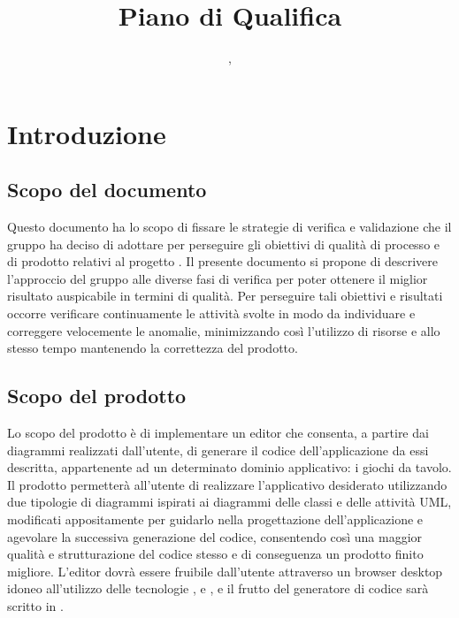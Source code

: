 


\author{\LS, \AZ}
\title{Piano di Qualifica}

\renewcommand{\arraystretch}{1.5}
\setcounter{tocdepth}{4}
\setcounter{secnumdepth}{4}


\maketitle

\tableofcontents
\newpage

\section{Introduzione}
	\subsection{Scopo del documento}
	Questo documento ha lo scopo di fissare le strategie di verifica e validazione che il gruppo {\hx} ha deciso di adottare per perseguire gli obiettivi di qualità di processo e di prodotto relativi al progetto {\proj}. Il presente documento si propone di descrivere l'approccio del gruppo alle diverse fasi di verifica per poter ottenere il miglior risultato auspicabile in termini di qualità. Per perseguire tali obiettivi e risultati occorre verificare continuamente le attività svolte in modo da individuare e correggere velocemente le anomalie, minimizzando così l'utilizzo di risorse e allo stesso tempo mantenendo la correttezza del prodotto.

	\subsection{Scopo del prodotto}
	Lo scopo del prodotto è di implementare un editor  che consenta, a partire dai diagrammi realizzati dall’utente, di generare il codice dell'applicazione da essi descritta, appartenente ad un determinato dominio applicativo: i giochi da tavolo. 
Il prodotto permetterà all’utente di realizzare l’applicativo desiderato utilizzando due tipologie di diagrammi ispirati ai diagrammi delle classi e delle attività UML, modificati appositamente per guidarlo nella progettazione dell'applicazione e agevolare la successiva generazione del codice, consentendo così una maggior qualità e strutturazione del codice stesso e di conseguenza un prodotto finito migliore.
L'editor dovrà essere fruibile dall'utente attraverso un browser desktop idoneo all'utilizzo delle tecnologie ,  e , e il frutto del generatore di codice sarà scritto in .

